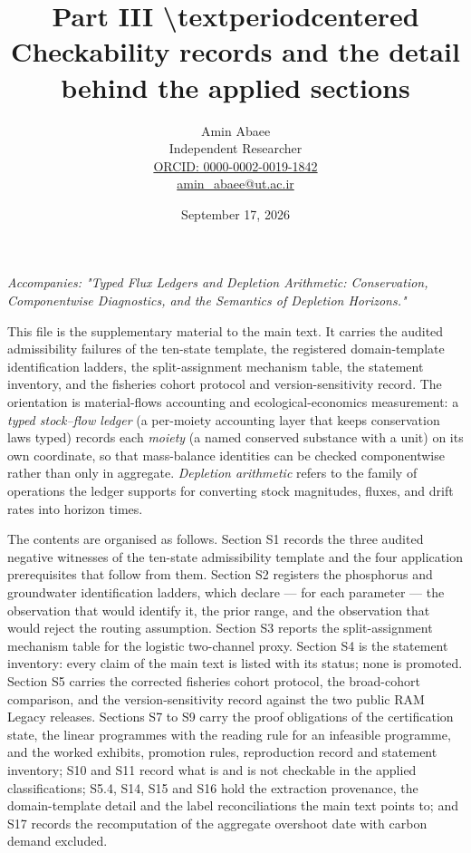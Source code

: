 \documentclass[11pt]{article}
\begin{document}
\title{Part III \textbackslash{}textperiodcentered{} Checkability records and the detail behind the applied sections}
\author{Amin Abaee\\[0.35em]
{\small Independent Researcher}\\[0.55em]
{\small\href{https://orcid.org/0000-0002-0019-1842}{ORCID: 0000-0002-0019-1842}}\\[0.3em]
{\small\href{mailto:amin\_abaee@ut.ac.ir}{amin\_abaee@ut.ac.ir}}}
\date{September 17, 2026}
\maketitle

\emph{Accompanies: "Typed Flux Ledgers and Depletion Arithmetic: Conservation, Componentwise Diagnostics, and the Semantics of Depletion Horizons."}

This file is the supplementary material to the main text. It carries the audited admissibility failures of the ten-state template, the registered domain-template identification ladders, the split-assignment mechanism table, the statement inventory, and the fisheries cohort protocol and version-sensitivity record. The orientation is material-flows accounting and ecological-economics measurement: a \emph{typed stock--flow ledger} (a per-moiety accounting layer that keeps conservation laws typed) records each \emph{moiety} (a named conserved substance with a unit) on its own coordinate, so that mass-balance identities can be checked componentwise rather than only in aggregate. \emph{Depletion arithmetic} refers to the family of operations the ledger supports for converting stock magnitudes, fluxes, and drift rates into horizon times.

The contents are organised as follows. Section S1 records the three audited negative witnesses of the ten-state admissibility template and the four application prerequisites that follow from them. Section S2 registers the phosphorus and groundwater identification ladders, which declare --- for each parameter --- the observation that would identify it, the prior range, and the observation that would reject the routing assumption. Section S3 reports the split-assignment mechanism table for the logistic two-channel proxy. Section S4 is the statement inventory: every claim of the main text is listed with its status; none is promoted. Section S5 carries the corrected fisheries cohort protocol, the broad-cohort comparison, and the version-sensitivity record against the two public RAM Legacy releases. Sections S7 to S9 carry the proof obligations of the certification state, the linear programmes with the reading rule for an infeasible programme, and the worked exhibits, promotion rules, reproduction record and statement inventory; S10 and S11 record what is and is not checkable in the applied classifications; S5.4, S14, S15 and S16 hold the extraction provenance, the domain-template detail and the label reconciliations the main text points to; and S17 records the recomputation of the aggregate overshoot date with carbon demand excluded.
\end{document}
